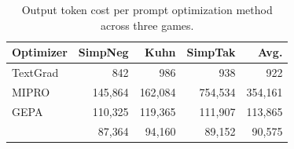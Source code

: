 \begin{table}
    \centering
    \vspace{-0.8em}
    \setlength{\tabcolsep}{2.5pt}
    \begin{tabular}{@{}lrrrr@{}}
    \toprule
    \textbf{Optimizer} & \textbf{SimpNeg} & \textbf{Kuhn} & \textbf{SimpTak} & \textbf{Avg.} \\
    \midrule
    TextGrad              &       842 &       986 &       938 &       922 \\
    MIPRO                 & 145{,}864 & 162{,}084 & 754{,}534 & 354{,}161 \\
    GEPA                  & 110{,}325 & 119{,}365 & 111{,}907 & 113{,}865 \\
    \textbf{\NAME{}} &  87{,}364 &  94{,}160 &  89{,}152 &  90{,}575 \\
    \bottomrule
    \end{tabular}
    \caption{Output token cost per prompt optimization method across three games.}
    \label{tab:token-cost}
    \vspace{-1em}
\end{table}
